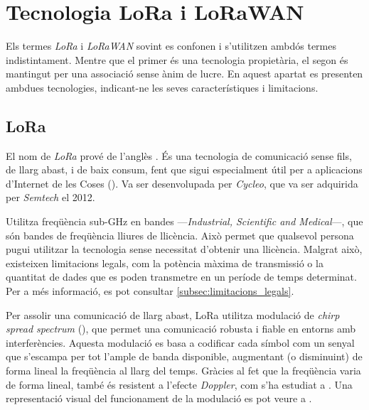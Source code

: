 \documentclass{tfgitic}[2024/07/01]
\begin{document}
\section{Tecnologia LoRa i LoRaWAN}
Els termes \emph{LoRa} i \emph{LoRaWAN} sovint es confonen i s'utilitzen ambdós termes indistintament. Mentre que el primer és una tecnologia propietària, el segon és mantingut per una associació sense ànim de lucre. En aquest apartat es presenten ambdues tecnologies, indicant-ne les seves característiques i limitacions.

\subsection{LoRa}
El nom de \emph{LoRa} prové de l'anglès . És una tecnologia de comunicació sense fils, de llarg abast, i de baix consum, fent que sigui especialment útil per a aplicacions d'Internet de les Coses (). Va ser desenvolupada per \emph{Cycleo}, que va ser adquirida per \emph{Semtech} el 2012.

Utilitza freqüència sub-GHz en bandes  ---\emph{Industrial, Scientific and Medical}---, que són bandes de freqüència lliures de llicència. Això permet que qualsevol persona pugui utilitzar la tecnologia sense necessitat d'obtenir una llicència. Malgrat això, existeixen limitacions legals, com la potència màxima de transmissió o la quantitat de dades que es poden transmetre en un període de temps determinat. Per a més informació, es pot consultar \ref{subsec:limitacions_legals}.

Per assolir una comunicació de llarg abast, LoRa utilitza modulació de \emph{chirp spread spectrum} (), que permet una comunicació robusta i fiable en entorns amb interferències. Aquesta modulació es basa a codificar cada símbol com un senyal que s'escampa per tot l'ample de banda disponible, augmentant (o disminuint) de forma lineal la freqüència al llarg del temps. Gràcies al fet que la freqüència varia de forma lineal, també és resistent a l'efecte \emph{Doppler}, com s'ha estudiat a \cite{doroshkin_experimental_2019}. Una representació visual del funcionament de la modulació  es pot veure a \cite{richard_wenner_lora_2017}.
\end{document}
